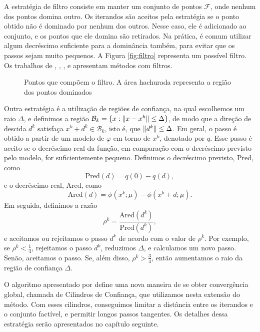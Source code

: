 A estratégia de filtro consiste em manter um conjunto de pontos $\mathcal{F}$,
onde nenhum dos pontos domina outro. Os iterandos são aceitos pela estratégia se
o ponto obtido não é dominado por nenhum dos outros. Nesse caso, ele é
adicionado ao conjunto, e os pontos que ele domina são retirados.
Na prática, é comum utilizar algum decréscimo suficiente para a dominância
também, para evitar que os passos sejam muito pequenos.
A Figura \ref{fig:filtro} representa um possível filtro. Os trabalhos
de \citet*{bib:gonzaga-filter}, \citet*{bib:ribeiro-filter},
\citet*{bib:karas-filter}, e \citet*{bib:pericaro-filter} apresentam métodos com
filtros.
\begin{figure}[!ht]
  \centering
  \caption{Pontos que compõem o filtro. A área hachurada representa a região dos
    pontos dominados}
\end{figure}

Outra estratégia é a utilização de regiões de confiança, na qual escolhemos um raio
$\Delta$, e definimos a região $\mathcal{B}_k=\{x:\Vert x-x^k\Vert\leq\Delta\}$, de
modo que a direção de descida $d^k$ satisfaça $x^k+d^k\in\mathcal{B}_k$,
isto é, que $\Vert d^k\Vert\leq\Delta$. 
Em geral, o passo é obtido a partir de um modelo de $\varphi$ em torno de $x^k$,
denotado por $q$. Esse passo é aceito se o decréscimo real da função, em
comparação com o decréscimo previsto pelo modelo, for suficientemente pequeno.
Definimos o decréscimo previsto, Pred, como
$$ \mbox{Pred}(d) = q(0) - q(d), $$
e o decréscimo real, Ared, como
$$ \mbox{Ared}(d) = \phi(x^k;\mu) - \phi(x^k+d;\mu). $$
Em seguida, definimos a razão
$$ \rho^k = \frac{\mbox{Ared}(d^k)}{\mbox{Pred}(d^k)}, $$
e aceitamos ou rejeitamos o passo $d^k$ de acordo com o valor de $\rho^k$.
Por exemplo, se $\rho^k < \frac{1}{4}$, rejeitamos o passo $d^k$, reduzimos
$\Delta$, e calculamos um novo passo. Senão, aceitamos o passo. Se, além disso,
$\rho^k > \frac{3}{4}$, então aumentamos o raio da região de confiança $\Delta$.

O algoritmo apresentado por \citet{bib:chico-dci} define uma nova maneira de se
obter convergência global, chamada de Cilindros de Confiança, que utilizamos
nesta extensão do método.
Com esses cilindros, conseguimos limitar a distância entre os iterandos e o
conjunto factível, e permitir longos passos tangentes.
Os detalhes dessa estratégia serão apresentados no capítulo seguinte.

